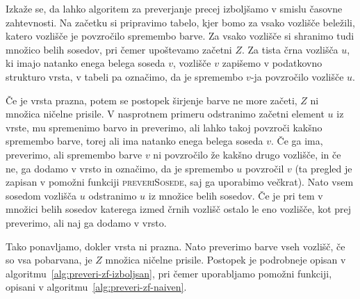 \documentclass[12pt,a4paper,twoside]{article}
\theoremstyle{definition} %
\theoremstyle{plain} %
\numberwithin{equation}{section}  %
\begin{document}
Izkaže se, da lahko algoritem za preverjanje precej izboljšamo v smislu časovne zahtevnosti. Na začetku si pripravimo tabelo, kjer bomo za vsako vozlišče beležili, katero vozlišče je povzročilo spremembo barve. Za vsako vozlišče si shranimo tudi množico belih sosedov, pri čemer upoštevamo začetni $Z$. Za tista črna vozlišča $u$, ki imajo natanko enega belega soseda $v$, vozlišče $v$ zapišemo v podatkovno strukturo vrsta, v tabeli pa označimo, da je spremembo $v$-ja povzročilo vozlišče $u$. 

Če je vrsta prazna, potem se postopek širjenje barve ne more začeti, $Z$ ni množica ničelne prisile. V nasprotnem primeru odstranimo začetni element $u$ iz vrste, mu spremenimo barvo in preverimo, ali lahko takoj povzroči kakšno spremembo barve, torej ali ima natanko enega belega soseda $v$. Če ga ima, preverimo, ali spremembo barve $v$ ni povzročilo že kakšno drugo vozlišče, in če ne, ga dodamo v vrsto in označimo, da je spremembo $u$ povzročil $v$ (ta pregled je zapisan v pomožni funkciji \textsc{preveriSosede}, saj ga uporabimo večkrat). Nato vsem sosedom vozlišča $u$ odstranimo $u$ iz množice belih sosedov. Če je pri tem v množici belih sosedov katerega izmed črnih vozlišč ostalo le eno vozlišče, kot prej preverimo, ali naj ga dodamo v vrsto.

Tako ponavljamo, dokler vrsta ni prazna. Nato preverimo barve vseh vozlišč, če so vsa pobarvana, je $Z$ množica ničelne prisile. Postopek je podrobneje opisan v algoritmu~\ref{alg:preveri-zf-izboljsan}, pri čemer uporabljamo pomožni funkciji, opisani v algoritmu~\ref{alg:preveri-zf-naiven}.
\end{document}
